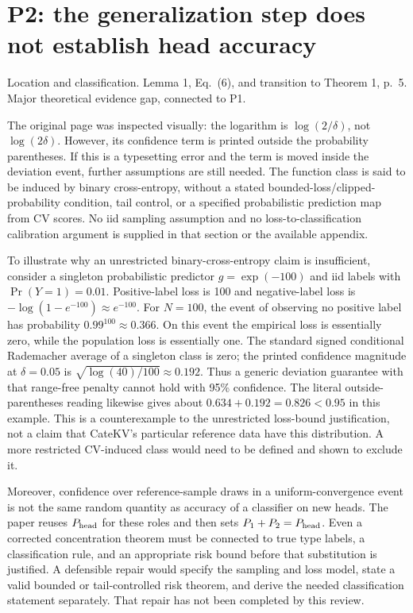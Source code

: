 \documentclass[10pt]{article}
\begin{document}
\section*{P2: the generalization step does not establish head accuracy}
Location and classification. Lemma 1, Eq. (6), and transition to Theorem 1, p. 5. Major theoretical evidence gap, connected to P1.\par
The original page was inspected visually: the logarithm is \(\log(2/\delta)\), not \(\log(2\delta)\). However, its confidence term is printed outside the probability parentheses. If this is a typesetting error and the term is moved inside the deviation event, further assumptions are still needed. The function class is said to be induced by binary cross-entropy, without a stated bounded-loss/clipped-probability condition, tail control, or a specified probabilistic prediction map from CV scores. No iid sampling assumption and no loss-to-classification calibration argument is supplied in that section or the available appendix.\par
To illustrate why an unrestricted binary-cross-entropy claim is insufficient, consider a singleton probabilistic predictor \(g=\exp(-100)\) and iid labels with \(\Pr(Y=1)=0.01\). Positive-label loss is 100 and negative-label loss is \(-\log(1-e^{-100})\approx e^{-100}\). For \(N=100\), the event of observing no positive label has probability \(0.99^{100}\approx0.366\). On this event the empirical loss is essentially zero, while the population loss is essentially one. The standard signed conditional Rademacher average of a singleton class is zero; the printed confidence magnitude at \(\delta=0.05\) is \(\sqrt{\log(40)/100}\approx0.192\). Thus a generic deviation guarantee with that range-free penalty cannot hold with 95\% confidence. The literal outside-parentheses reading likewise gives about \(0.634+0.192=0.826<0.95\) in this example. This is a counterexample to the unrestricted loss-bound justification, not a claim that CateKV’s particular reference data have this distribution. A more restricted CV-induced class would need to be defined and shown to exclude it.\par
Moreover, confidence over reference-sample draws in a uniform-convergence event is not the same random quantity as accuracy of a classifier on new heads. The paper reuses \(P_{\rm head}\) for these roles and then sets \(P_1+P_2=P_{\rm head}\). Even a corrected concentration theorem must be connected to true type labels, a classification rule, and an appropriate risk bound before that substitution is justified. A defensible repair would specify the sampling and loss model, state a valid bounded or tail-controlled risk theorem, and derive the needed classification statement separately. That repair has not been completed by this review.\par
\end{document}

